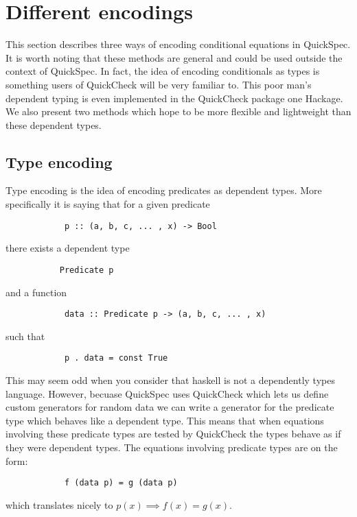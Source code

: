 \section{Different encodings}\label{encodings}

    This section describes three
    ways of encoding conditional
    equations in QuickSpec. It is
    worth noting that these methods
    are general and could be used outside
    the context of QuickSpec. In fact,
    the idea of encoding conditionals
    as types is something users of
    QuickCheck %
    will be very familiar to. This poor
    man's dependent typing is even implemented
    in the QuickCheck package one Hackage.%
    We also present two methods which hope to be
    more flexible and lightweight than these
    dependent types. 

    \subsection{Type encoding}

        Type encoding is the idea of encoding
        predicates as dependent types. More specifically
        it is saying that for a given predicate
        \begin{verbatim}
            p :: (a, b, c, ... , x) -> Bool
        \end{verbatim}
        there exists a dependent type
        \begin{verbatim}
           Predicate p
        \end{verbatim}
        and a function 
        \begin{verbatim}
            data :: Predicate p -> (a, b, c, ... , x)
        \end{verbatim}
        such that 
        \begin{verbatim}
            p . data = const True
        \end{verbatim}
        This may seem odd when you consider that haskell is not a dependently types
        language. However, becuase QuickSpec uses QuickCheck which lets us define
        custom generators for random data we can write a generator for 
        the predicate type which behaves like a dependent type.
        This means that when equations involving these predicate
        types are tested by QuickCheck the types behave as if they were dependent types.
        The equations involving predicate types are on the form:
        \begin{verbatim}
            f (data p) = g (data p)
        \end{verbatim}
        which translates nicely to $p(x) \implies f(x) = g(x)$.

